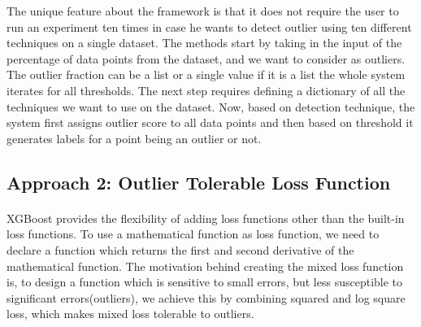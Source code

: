 \documentclass[runningheads]{llncs}
\begin{document}
The unique feature about the framework is that it does not require the user to run an experiment ten times in case he wants to detect outlier using ten different techniques on a single dataset. The methods start by taking in the input of the percentage of data points from the dataset, and we want to consider as outliers. The outlier fraction can be a list or a single value if it is a list the whole system iterates for all thresholds. The next step requires defining a dictionary of all the techniques we want to use on the dataset. Now, based on detection technique, the system first assigns outlier score to all data points and then based on threshold it generates labels for a point being an outlier or not.



\subsection{Approach 2: Outlier Tolerable Loss Function}

\paragraph{} XGBoost provides the flexibility of adding loss functions other than the built-in loss functions. To use a mathematical function as loss function, we need to declare a function which returns the first and second derivative of the mathematical function. The motivation behind creating the mixed loss function is, to design a function which is sensitive to small errors, but less susceptible to significant errors(outliers), we achieve this by combining squared and log square loss, which makes mixed loss tolerable to outliers.
\end{document}
